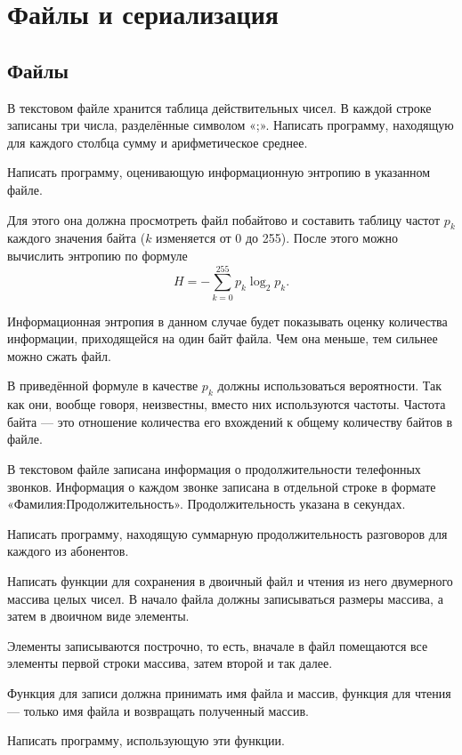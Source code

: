 \section{Файлы и сериализация}

\subsection{Файлы}

\task В текстовом файле хранится таблица действительных чисел. В
каждой строке записаны три числа, разделённые символом «;». Написать
программу, находящую для каждого столбца сумму и арифметическое
среднее.

\task Написать программу, оценивающую информационную энтропию в
указанном файле.

Для этого она должна просмотреть файл побайтово и составить таблицу
частот $p_k$ каждого значения байта ($k$ изменяется от 0 до
255). После этого можно вычислить энтропию по формуле
\[
H = - \sum_{k=0}^{255} p_k \log_2 p_k.
\]

Информационная энтропия в данном случае будет показывать оценку
количества информации, приходящейся на один байт файла. Чем она
меньше, тем сильнее можно сжать файл.

В приведённой формуле в качестве $p_k$ должны использоваться
вероятности. Так как они, вообще говоря, неизвестны, вместо них
используются частоты. Частота байта — это отношение количества его
вхождений к общему количеству байтов в файле.

\task В текстовом файле записана информация о продолжительности
телефонных звонков.  Информация о каждом звонке записана в отдельной
строке в формате «Фамилия:Продолжительность». Продолжительность
указана в секундах.

Написать программу, находящую суммарную продолжительность разговоров
для каждого из абонентов.

\task Написать функции для сохранения в двоичный файл и чтения из него
двумерного массива целых чисел. В начало файла должны записываться
размеры массива, а затем в двоичном виде элементы.

Элементы записываются построчно, то есть, вначале в файл помещаются
все элементы первой строки массива, затем второй и так далее.

Функция для записи должна принимать имя файла и массив, функция для
чтения — только имя файла и возвращать полученный массив.

Написать программу, использующую эти функции.

